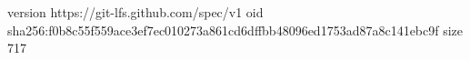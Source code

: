 version https://git-lfs.github.com/spec/v1
oid sha256:f0b8c55f559ace3ef7ec010273a861cd6dffbb48096ed1753ad87a8c141ebc9f
size 717
